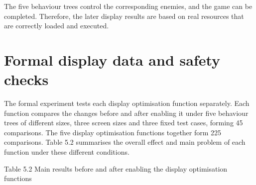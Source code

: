 \documentclass[11pt,a4paper,oneside,extrafontsizes]{memoir}
\begin{document}
The five behaviour trees control the corresponding enemies, and the game can be completed. Therefore, the later display results are based on real resources that are correctly loaded and executed.

\section{Formal display data and safety checks}

The formal experiment tests each display optimisation function separately. Each function compares the changes before and after enabling it under five behaviour trees of different sizes, three screen sizes and three fixed test cases, forming 45 comparisons. The five display optimisation functions together form 225 comparisons. Table 5.2 summarises the overall effect and main problem of each function under these different conditions.

Table 5.2 Main results before and after enabling the display optimisation functions
\end{document}
